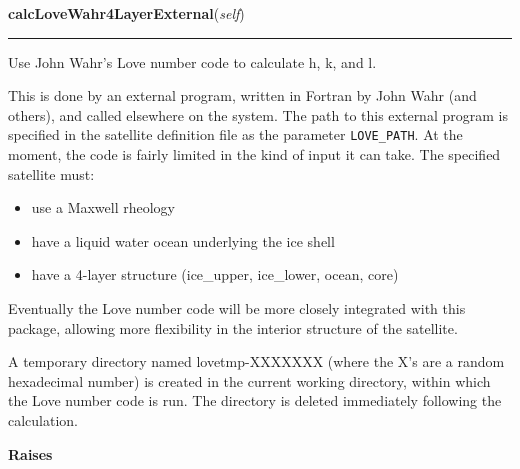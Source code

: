     \label{SatStress:SatStress:StressDef:calcLoveWahr4LayerExternal}

    \vspace{0.5ex}

\hspace{.8\funcindent}\begin{boxedminipage}{\funcwidth}

    \raggedright \textbf{calcLoveWahr4LayerExternal}(\textit{self})

    \vspace{-1.5ex}

    \rule{\textwidth}{0.5\fboxrule}
\setlength{\parskip}{2ex}
    Use John Wahr's Love number code to calculate h, k, and l.

    This is done by an external program, written in Fortran by John Wahr 
    (and others), and called elsewhere on the system.  The path to this 
    external program is specified in the satellite definition file as the 
    parameter \texttt{LOVE\_PATH}.  At the moment, the code is fairly 
    limited in the kind of input it can take.  The specified satellite 
    must:

    \begin{itemize}
    \setlength{\parskip}{0.6ex}
      \item use a Maxwell rheology

      \item have a liquid water ocean underlying the ice shell

      \item have a 4-layer structure (ice\_upper, ice\_lower, ocean, core)

    \end{itemize}

    Eventually the Love number code will be more closely integrated with 
    this package, allowing more flexibility in the interior structure of 
    the satellite.

    A temporary directory named lovetmp-XXXXXXX (where the X's are a random
    hexadecimal number) is created in the current working directory, within
    which the Love number code is run.  The directory is deleted 
    immediately following the calculation.

\setlength{\parskip}{1ex}
      \textbf{Raises}
    \vspace{-1ex}


\end{boxedminipage}
